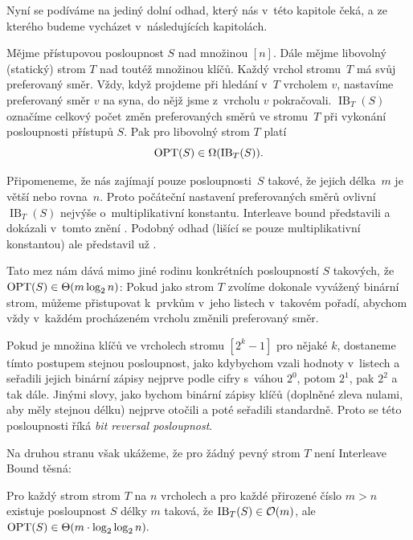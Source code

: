 Nyní se podíváme na jediný dolní odhad, který nás v~této kapitole čeká, a ze kterého budeme vycházet v~následujících kapitolách.

\def\ib{\operatorname{IB}}

\begin{veta}
Mějme přístupovou posloupnost $S$ nad množinou $[n]$. Dále mějme libovolný
(statický) strom $T$ nad toutéž množinou klíčů. Každý vrchol stromu~$T$ má svůj
preferovaný směr. Vždy, když projdeme při hledání v~$T$ vrcholem $v$, nastavíme preferovaný směr
$v$ na syna, do nějž jsme z~vrcholu $v$ pokračovali. $\ib_T(S)$ označíme
celkový počet změn preferovaných směrů ve stromu~$T$ při vykonání posloupnosti přístupů $S$. Pak pro
libovolný strom $T$ platí $$\opt(S) \in \Omega(\ib_T(S)).$$ 
\end{veta}

Připomeneme, že nás zajímají pouze
posloupnosti~$S$ takové, že jejich délka~$m$ je větší nebo rovna~$n$. Proto počáteční
nastavení preferovaných směrů ovlivní $\ib_T(S)$ nejvýše o~multiplikativní
konstantu.
Interleave bound představili a dokázali v~tomto znění \citet{tango}. Podobný odhad (lišící se pouze multiplikativní konstantou) ale představil už \citet{interleave}.

Tato mez nám dává mimo jiné rodinu konkrétních posloupností $S$ takových, že
$\opt(S)\in\Theta(m\log n)$: Pokud jako strom $T$ zvolíme dokonale vyvážený
binární strom, můžeme přistupovat k~prvkům v~jeho listech v~takovém pořadí,
abychom vždy v~každém procházeném vrcholu změnili preferovaný směr.

Pokud je množina klíčů ve vrcholech stromu $[2^k-1]$ pro nějaké $k$, dostaneme
tímto postupem stejnou posloupnost, jako kdybychom vzali hodnoty v~listech a
seřadili jejich binární zápisy nejprve podle cifry s~váhou $2^0$, potom $2^1$,
pak $2^2$ a tak dále. Jinými slovy, jako bychom binární zápisy klíčů (doplněné
zleva nulami, aby měly stejnou délku) nejprve otočili a poté seřadili
standardně. Proto se této posloupnosti říká \emph{bit reversal posloupnost}.

Na druhou stranu však ukážeme, že pro žádný pevný strom $T$ není Interleave Bound těsná:
\begin{tvrz}
Pro každý strom strom $T$ na $n$ vrcholech a pro každé přirozené číslo $m>n$ existuje posloupnost $S$ délky $m$ taková, že $\ib_T(S) \in \o(m)$, ale $\opt(S) \in \Theta(m\cdot\log\log n).$ 
\end{tvrz}

